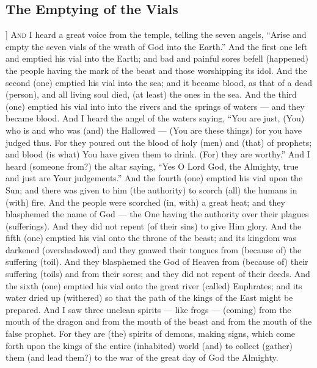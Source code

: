 \begin{pages}
\begin{Leftside}
        			\chapter{The Emptying of the Vials}
				]		
		\renewcommand{\LettrineFontHook}{\Zallmanfamily}
		\lettrine[lines=3]{A}{nd} I heard a great voice from the temple, telling the seven angels, “Arise and empty the seven vials of the wrath of God into the Earth.” And the first one left and emptied his vial into the Earth; and bad and painful sores befell (happened) the people having the mark of the beast and those worshipping its idol. 
		\pend
		\pstart
		And the second (one) emptied his vial into the sea; and it became blood, as that of a dead (person), and all living soul died, (at least) the ones in the sea. And the third (one) emptied his vial into into the rivers and the springs of waters — and they became blood. And I heard the angel of the waters saying, “You are just, (You) who is and who was (and) the Hallowed — (You are these things) for you have judged thus. For they poured out the blood of holy (men) and (that) of prophets; and blood (is what) You have given them to drink. (For) they are worthy.”
		\pend
		\pstart
		And I heard (someone from?) the altar saying, “Yes O Lord God, the Almighty, true and just are Your judgements.” And the fourth (one) emptied his vial upon the Sun; and there was given to him (the authority) to scorch (all) the humans in (with) fire. And the people were scorched (in, with) a great heat; and they blasphemed the name of God — the One having the authority over their plagues (sufferings). And they did not repent (of their sins) to give Him glory. 
		\pend
		\pstart
		And the fifth (one) emptied his vial onto the throne of the beast; and its kingdom was darkened (overshadowed) and they gnawed their tongues from (because of) the suffering (toil). And they blasphemed the God of Heaven from (because of) their suffering (toils) and from their sores; and they did not repent of their deeds. 
		\pend
		\pstart
		And the sixth (one) emptied his vial onto the great river (called) Euphrates; and its water dried up (withered) so that the path of the kings of the East might be prepared. And I saw three unclean spirits — like frogs — (coming) from the mouth of the dragon and from the mouth of the beast and from the mouth of the false prophet. For they are (the) spirits of demons, making signs, which come forth upon the kings of the entire (inhabited) world (and) to collect (gather) them (and lead them?) to the war of the great day of God the Almighty. 
		\pend
		\pstart

\end{Leftside}
\end{pages}
